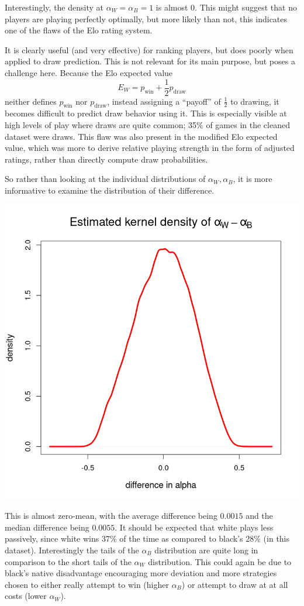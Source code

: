 \documentclass{article}
\newcommand{\pw}{p_{\text{win}}}
\newcommand{\pd}{p_{\text{draw}}}
\begin{document}
Interestingly, the density at $\alpha_W=\alpha_B=1$ is almost $0$.
This might suggest that no players are playing perfectly optimally, but more likely than not,
this indicates one of the flaws of the Elo rating system.

It is clearly useful (and very effective) for ranking players, but does poorly when applied
to draw prediction. This is not relevant for its main purpose, but poses a challenge here.
Because the Elo expected value $$E_W=\pw + \frac{1}{2}\pd$$
neither defines $\pw$ nor $\pd$, instead assigning a ``payoff'' of $\frac{1}{2}$ to drawing,
it becomes difficult to predict draw behavior using it.
This is especially visible at high levels of play where draws are quite common;
35\% of games in the cleaned dataset were draws.
This flaw was also present in the
modified Elo expected value, which was more to
derive relative playing strength in the form of adjusted ratings, rather than directly compute draw probabilities.

So rather than looking at the individual distributions of $\alpha_W,\alpha_B$, it is more informative to examine
the distribution of their difference.

\includegraphics[width=\textwidth]{./diff.png}

This is almost zero-mean, with the average difference being $0.0015$ and the median difference being $0.0055$.
It should be expected that white plays less passively, since white wins 37\% of the time as compared
to black's 28\%
(in this dataset).
Interestingly the tails of the $\alpha_B$ distribution are quite long in comparison to the short tails of the $\alpha_W$ distribution.
This could again be due to black's native disadvantage encouraging more deviation and more strategies chosen
to either really attempt to win (higher $\alpha_B$) or attempt to draw at at all costs (lower $\alpha_W$).
\end{document}
